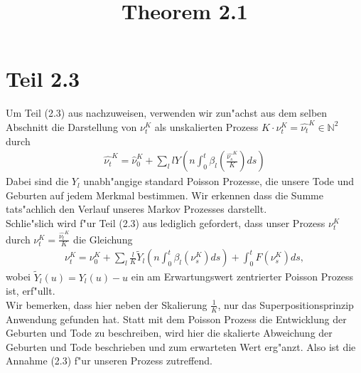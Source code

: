 \documentclass[11pt,a4paper]{article}
\title{Theorem 2.1}
\theoremstyle{plain}
\begin{document}
\maketitle
\section*{Teil 2.3}
Um Teil (2.3) aus \cite[Kapitel 11]{ethier2009markov} nachzuweisen, verwenden wir zun"achst aus dem selben Abschnitt die Darstellung von $ \nu_t^K $ als unskalierten Prozess $ K\cdot \nu_t^K = \hat{\nu_t}^K \in \mathbb{N}^2 $ durch
\begin{align}
	\hat{\nu_t}^K = \hat{\nu}_0^K + \sum_{l} l Y \left( n \int_{0}^{t} \beta_l\left(\frac{\hat{\nu_s}^K}{K}\right) ds \right)
\end{align}
Dabei sind die $ Y_l $ unabh"angige standard Poisson Prozesse, die unsere Tode und Geburten auf jedem Merkmal bestimmen. Wir erkennen dass die Summe tats"achlich den Verlauf unseres Markov Prozesses darstellt.\\
Schlie"slich wird f"ur Teil (2.3) aus \cite[Kapitel 11]{ethier2009markov} lediglich gefordert, dass unser Prozess $ \nu_t^K $ durch $ \nu_t^K = \frac{\hat{\nu_t}^K}{K} $ die Gleichung
\begin{align}
	\nu_t^K = \nu_0^K + \sum_{l} \frac{l}{K} \widetilde{Y}_l \left( n \int_{0}^{t} \beta_l(\nu_s^K) ds \right) + \int_{0}^{t} F(\nu_s^K) ds,
\end{align}
wobei $ \widetilde{Y}_l(u) = Y_l(u) - u $ ein am Erwartungswert zentrierter Poisson Prozess ist, erf"ullt.\\
Wir bemerken, dass hier neben der Skalierung $ \frac{1}{K} $, nur das Superpositionsprinzip Anwendung gefunden hat. Statt mit dem Poisson Prozess die Entwicklung der Geburten und Tode zu beschreiben, wird hier die skalierte Abweichung der Geburten und Tode beschrieben und zum erwarteten Wert erg"anzt. Also ist die Annahme (2.3) f"ur unseren Prozess zutreffend.

	

\end{document}
